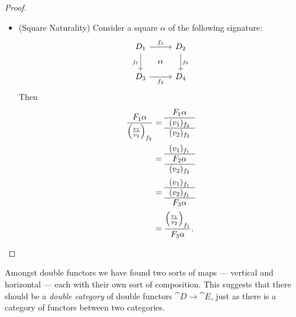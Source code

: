 \documentclass[DynamicalBook]{subfiles}
\begin{document}
\begin{proof}
\begin{itemize}
\item (Square Naturality) Consider a square $\alpha$ of the following signature:
\[
        \begin{tikzcd}[sep=tiny]
          D_1 \ar[dd, "j_1"'] \ar[rr, "f_1"] & & D_2
 \ar[dd, "j_2"] \\
           & \alpha & \\
          D_3 \ar[rr, "f_2"'] & & D_4
        \end{tikzcd}
\]
  Then
    \begin{align*}
      \frac{F_1 \alpha}{\left( \frac{v_1}{v_2} \right)_{f_2}} &= \begin{tabular}{c}
        $F_1 \alpha $ \\ \hline
        $(v_1)_{f_2}$ \\ \hline
        $(v_2)_{f_2}$ 
     \end{tabular} \\
&= \begin{tabular}{c}
        $(v_1)_{f_1}$ \\ \hline
        $F_2 \alpha$ \\ \hline
        $(v_2)_{f_2}$ 
     \end{tabular} \\
&= \begin{tabular}{c}
        $(v_1)_{f_1}$ \\ \hline
        $(v_2)_{f_1}$ \\ \hline
        $F_3 \alpha$ 
     \end{tabular} \\
&= \frac{\left( \frac{v_1}{v_2} \right)_{f_1}}{F_3 \alpha}.
    \end{align*}
  \end{itemize}
  
\end{proof}

Amongst double functors we have found two sorts of maps --- vertical and
horizontal --- each with their own sort of composition. This suggests that there
should be a \emph{double category} of double functors $\cat{D} \to \cat{E}$,
just as there is a category of functors between two categories. 
\end{document}
